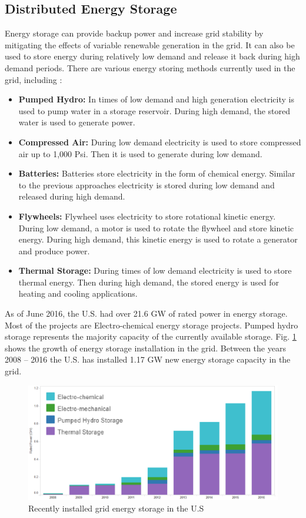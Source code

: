 \subsection{Distributed Energy Storage}
Energy storage can provide backup power and increase grid stability by mitigating the effects of variable renewable generation in the grid. It can also be used to store energy during relatively low demand and release it back during high demand periods. There are various energy storing methods currently used in the grid, including \cite{GE1}:
\begin{itemize}
    \item \textbf{Pumped Hydro:} In times of low demand and high generation electricity is used to pump water in a storage reservoir. During high demand, the stored water is used to generate power.
    \item \textbf{Compressed Air:} During low demand electricity is used to store compressed air up to 1,000 Psi. Then it is used to generate during low demand.
    \item \textbf{Batteries:} Batteries store electricity in the form of chemical energy. Similar to the previous approaches electricity is stored during low demand and released during high demand.
    \item \textbf{Flywheels:} Flywheel uses electricity to store rotational kinetic energy. During low demand, a motor is used to rotate the flywheel and store kinetic energy. During high demand, this kinetic energy is used to rotate a generator and produce power.
    \item \textbf{Thermal Storage:} During times of low demand electricity is used to store thermal energy. Then during high demand, the stored energy is used for heating and cooling applications.
\end{itemize}

As of June 2016, the U.S. had over 21.6 GW of rated power in energy storage. Most of the projects are Electro-chemical energy storage projects. Pumped hydro storage represents the majority capacity of the currently available storage. Fig. \ref{fig:ES_INCREASE} shows the growth of energy storage installation in the grid. Between the years 2008 – 2016 the U.S. has installed 1.17 GW new energy storage capacity in the grid. 

\begin{figure}[!h]
\centering
\includegraphics[width=0.85\linewidth]{figs/ES_INCREASE.png}
\caption[Recently installed grid energy storage in the U.S.]{Recently installed grid energy storage in the U.S \cite{GE2}}
\label{fig:ES_INCREASE}
\end{figure}


